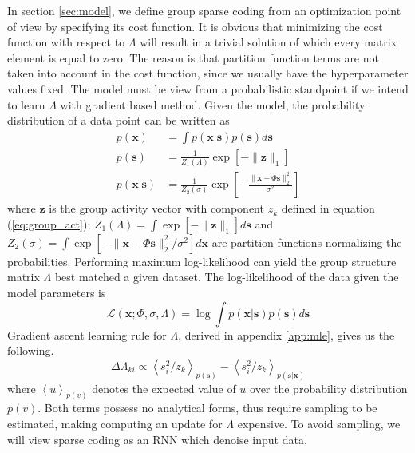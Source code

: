 In section \ref{sec:model}, we define group sparse coding from an optimization point of view by specifying its cost function. It is obvious that minimizing the cost function with respect to $\Lambda$ will result in a trivial solution of which every matrix element is equal to zero. The reason is that partition function terms are not taken into account in the cost function, since we usually have the hyperparameter values fixed. The model must be view from a probabilistic standpoint \cite{ob97} if we intend to learn $\Lambda$ with gradient based method. Given the model, the probability distribution of a data point can be written as
\begin{align}
p(\boldsymbol{x}) &= \int p(\boldsymbol{x}|\boldsymbol{s})
					 p(\boldsymbol{s}) d\boldsymbol{s} \\
\label{eq:p_s}
p(\boldsymbol{s}) &= \frac{1}{Z_1(\Lambda)}
					 \exp\left[ -\| \boldsymbol{z} \|_1 \right] \\
p(\boldsymbol{x|s}) &= \frac{1}{Z_2(\sigma)}
					   \exp\left[-\frac{\|\boldsymbol{x}-\Phi\boldsymbol{s}\|_2^2}
					                   {\sigma^2} \right]
\end{align}
where $\boldsymbol{z}$ is the group activity vector with component $z_k$ defined in equation (\ref{eq:group_act}); $Z_1(\Lambda) = \int \exp\left[ -\| \boldsymbol{z} \|_1 \right] d\boldsymbol{s}$ and $Z_2(\sigma) = \int\exp\left[-\|\boldsymbol{x}-\Phi\boldsymbol{s}\|_2^2 / \sigma^2 \right] d\boldsymbol{x}$ are partition functions normalizing the probabilities. Performing maximum log-likelihood can yield the group structure matrix  $\Lambda$ best matched a given dataset. The log-likelihood of the data given the model parameters is
\begin{equation}
\mathcal{L}(\boldsymbol{x}; \Phi, \sigma, \Lambda) = \log\int
	p(\boldsymbol{x|s}) p(\boldsymbol{s}) d\boldsymbol{s}
\end{equation}
Gradient ascent learning rule for $\Lambda$, derived in appendix \ref{app:mle}, gives us the following.
\begin{equation}
\label{eq:lambdaupdate}
\Delta\Lambda_{ki} \propto
	\left< s_i^2 / z_k \right>_{p(\boldsymbol{s})} -
	\left< s_i^2 / z_k \right>_{p(\boldsymbol{s}|\boldsymbol{x})}
\end{equation}
where $\left< u \right>_{p(v)}$ denotes the expected value of $u$ over the probability distribution $p(v)$. Both terms possess no analytical forms, thus require sampling to be estimated, making computing an update for $\Lambda$ expensive. To avoid sampling, we will view sparse coding as an RNN which denoise input data.

